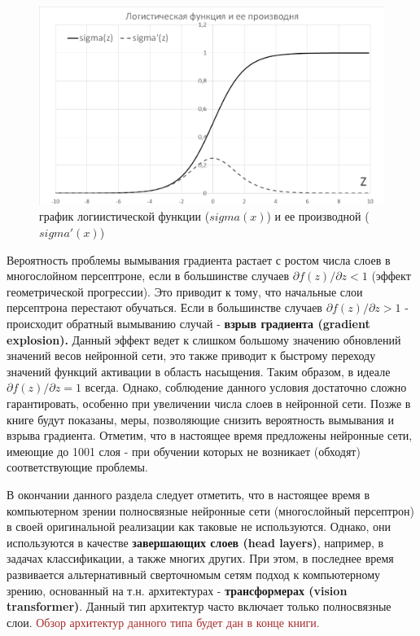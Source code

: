 \documentclass[12pt]{article}
\begin{document}
\begin{sloppypar}
     \begin{figure}
     	\begin{center}
     		\includegraphics[width=0.65\linewidth]{./figuresch1/logistic_and_derivative.png}
     		\caption{график логиистической функции ($sigma(x)$) и ее производной ($sigma'(x)$)}		
     		\label{ch1:fig:logistic_and_derivative}
     	\end{center}
     \end{figure}

Вероятность проблемы вымывания градиента растает с ростом числа слоев в многослойном персептроне, если в большинстве случаев $\partial f(z)/\partial z < 1$ (эффект геометрической прогрессии). Это приводит к тому, что начальные слои персептрона перестают обучаться. Если в большинстве случаев  $\partial f(z)/\partial z > 1$ - происходит обратный вымыванию случай - \textbf{взрыв градиента (gradient explosion).} Данный эффект ведет к слишком большому  значению обновлений значений весов нейронной сети, это также приводит к быстрому переходу значений функций активации в область насыщения. Таким образом, в идеале $\partial f(z)/\partial z = 1$ всегда. Однако, соблюдение данного условия достаточно сложно гарантировать, особенно при увеличении числа слоев в нейронной сети. Позже в книге будут показаны, меры, позволяющие снизить вероятность вымывания и взрыва градиента. Отметим, что в настоящее время предложены нейронные сети, имеющие до 1001 слоя - при обучении которых не возникает (обходят) соответствующие проблемы.

В окончании данного раздела следует отметить, что в настоящее время в компьютерном зрении полносвязные нейронные сети (многослойный персептрон) в своей оригинальной реализации как таковые не используются. Однако, они используются в качестве \textbf{завершающих слоев (head layers)}, например, в задачах классификации, а также многих других.  При этом, в последнее время развивается альтернативный сверточномым сетям подход к компьютерному зрению, основанный на т.н. архитектурах - \textbf{трансформерах (vision transformer)}. Данный тип архитектур часто включает только полносвязные слои. \textcolor{brown}{Обзор архитектур данного типа будет дан в конце книги.}


\end{sloppypar}
\end{document}
